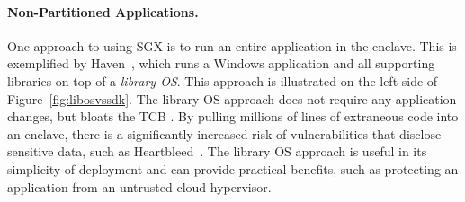 


\paragraph{Non-Partitioned Applications.}
One approach to using SGX is to run an entire application in the enclave.
This is exemplified by Haven~\cite{baumann14haven}, which runs a Windows application and all supporting libraries
on top of a {\em library OS}.  This approach is illustrated on the left side of Figure~\ref{fig:libosvssdk}.
The library OS approach does not require any application changes, but bloats the TCB .
By pulling millions of lines of extraneous code into an enclave, there is a significantly increased risk 
of vulnerabilities that disclose
sensitive data, such as Heartbleed~.
The library OS approach is useful in its simplicity of deployment and can provide practical benefits, 
such as protecting an application from an untrusted cloud hypervisor.

